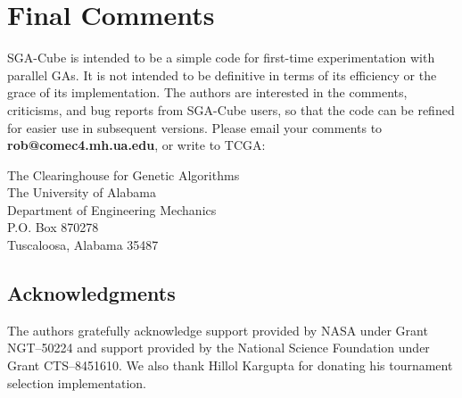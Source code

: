 \section{Final Comments}
SGA-Cube is intended to be a simple
code for first-time experimentation with parallel GAs. It is 
not intended to be 
definitive in terms of its efficiency 
or the grace of its implementation. The
authors are interested in the comments, criticisms, and bug reports
from SGA-Cube users, so that the code can be refined for
easier use in subsequent versions.
Please email your comments to {\bf rob@comec4.mh.ua.edu},
or write to TCGA:
\begin{center}
The Clearinghouse for Genetic Algorithms\\
The University of Alabama\\
Department of Engineering Mechanics\\
P.O. Box 870278\\
Tuscaloosa, Alabama 35487
\end{center}

\subsection*{Acknowledgments}
The authors gratefully acknowledge support provided by NASA under
Grant NGT--50224 and support provided by the 
National Science Foundation under Grant CTS--8451610.
We also thank Hillol Kargupta for donating his tournament selection
implementation.





